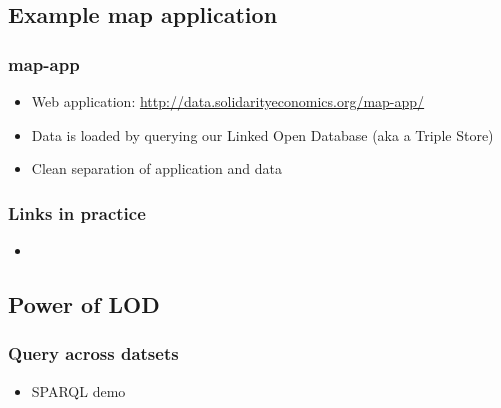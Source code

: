 \subsection{Example map application}
\frame
{
  \frametitle{map-app}
  \begin{itemize}
    \item Web application: \url{http://data.solidarityeconomics.org/map-app/}
    \item Data is loaded by querying our Linked Open Database (aka a Triple Store)
    \item Clean separation of application and data
  \end{itemize}
}
\frame
{
  \frametitle{Links in practice}
  \begin{center}
  \end{center}
  \begin{itemize}
    \item
  \end{itemize}
}
\subsection{Power of LOD}
\frame
{
  \frametitle{Query across datsets}
  \begin{itemize}
    \item SPARQL demo
  \end{itemize}
}


